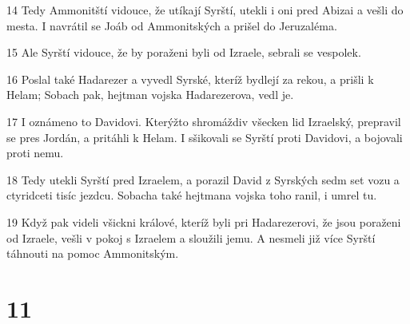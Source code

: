 \par 14 Tedy Ammonitští vidouce, že utíkají Syrští, utekli i oni pred Abizai a vešli do mesta. I navrátil se Joáb od Ammonitských a prišel do Jeruzaléma.
\par 15 Ale Syrští vidouce, že by poraženi byli od Izraele, sebrali se vespolek.
\par 16 Poslal také Hadarezer a vyvedl Syrské, kteríž bydlejí za rekou, a prišli k Helam; Sobach pak, hejtman vojska Hadarezerova, vedl je.
\par 17 I oznámeno to Davidovi. Kterýžto shromáždiv všecken lid Izraelský, prepravil se pres Jordán, a pritáhli k Helam. I sšikovali se Syrští proti Davidovi, a bojovali proti nemu.
\par 18 Tedy utekli Syrští pred Izraelem, a porazil David z Syrských sedm set vozu a ctyridceti tisíc jezdcu. Sobacha také hejtmana vojska toho ranil, i umrel tu.
\par 19 Když pak videli všickni králové, kteríž byli pri Hadarezerovi, že jsou poraženi od Izraele, vešli v pokoj s Izraelem a sloužili jemu. A nesmeli již více Syrští táhnouti na pomoc Ammonitským.

\chapter{11}


